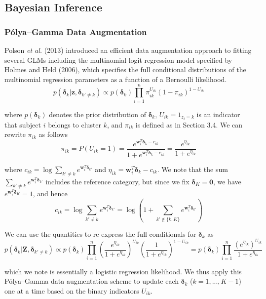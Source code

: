 \documentclass{article}
\begin{document}
\subsection{Bayesian Inference}

\subsubsection{P\'olya--Gamma Data Augmentation}

Polson \textit{et al.} (2013) introduced an efficient data augmentation approach to fitting several GLMs including the multinomial logit regression model specified by Holmes and Held (2006), which specifies the full conditional distributions of the multinomial regression parameters as a function of a Bernoulli likelihood. 
$$p(\boldsymbol\delta_k|\mathbf{z},\boldsymbol\delta_{k' \ne k}) \propto p(\boldsymbol\delta_k) \prod_{i = 1}^{n} \pi_{ik}^{U_{ik}}(1-\pi_{ik})^{1-U_{ik}}$$

where $p(\boldsymbol\delta_k)$ denotes the prior distribution of $\boldsymbol\delta_k$, $U_{ik} = {1}_{z_i = k}$ is an indicator that subject $i$ belongs to cluster $k$, and $\pi_{ik}$ is defined as in Section 3.4. We can rewrite $\pi_{ik}$ as follows
$$\pi_{ik} = P(U_{ik} = 1) = \frac{e^{\mathbf{w}_i^T \boldsymbol\delta_k - {c}_{ik}}}{1 + e^{\mathbf{w}_i^T \boldsymbol\delta_k - {c}_{ik}}} = \frac{e^{\eta_{ik}}}{1 + e^{\eta_{ik}}}$$

where ${c}_{ik} = \log \sum_{k' \ne k} e^{\mathbf{w}_i^T \boldsymbol\delta_{k'}}$ and $\eta_{ik} = \mathbf{w}_i^T \boldsymbol\delta_k - {c}_{ik}$. We note that the sum $\sum_{k' \ne k} e^{\mathbf{w}_i^T \boldsymbol\delta_{k'}}$ includes the reference category, but since we fix $\boldsymbol\delta_K = \mathbf{0}$, we have $e^{\mathbf{w}_i^T \boldsymbol\delta_K} = 1$, and hence
$$c_{ik} = \log \sum_{k' \ne k} e^{\mathbf{w}_i^T \boldsymbol\delta_{k'}} = \log \left ( 1 + \sum_{k' \notin \{k,K \}} e^{\mathbf{w}_i^T \boldsymbol\delta_{k'}} \right )$$

We can use the quantities to re-express the full conditionals for $\boldsymbol\delta_k$ as 
$$p(\boldsymbol\delta_k|\mathbf{Z},\boldsymbol\delta_{k' \ne k}) \propto p(\boldsymbol\delta_k) \prod_{i = 1}^{n} \left (\frac{e^{\eta_{ik}}}{1 + e^{\eta_{ik}}} \right )^{U_{ik}} \left (\frac{1}{1 + e^{\eta_{ik}}} \right )^{1-U_{ik}} = p(\boldsymbol\delta_k) \prod_{i = 1}^n \frac{(e^{\eta_{ik}})^{U_{ik}}}{1 + e^{\eta_{ik}}}$$

which we note is essentially a logistic regression likelihood. We thus apply this P\'olya--Gamma data augmentation scheme to update each $\boldsymbol\delta_k$ ($k = 1,...,K-1$) one at a time based on the binary indicators $U_{ik}$.
\end{document}
